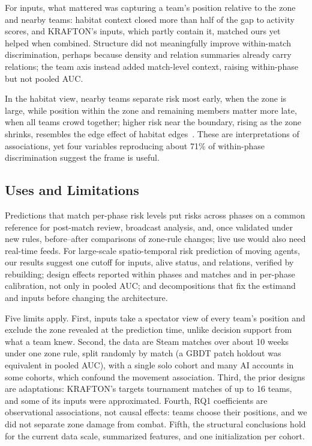 \documentclass[conference]{IEEEtran}
\begin{document}
For inputs, what mattered was capturing a team's position relative to the zone and nearby teams: habitat context closed more than half of the gap to activity scores, and KRAFTON's inputs, which partly contain it, matched ours yet helped when combined.
Structure did not meaningfully improve within-match discrimination, perhaps because density and relation summaries already carry relations; the team axis instead added match-level context, raising within-phase but not pooled AUC.

In the habitat view, nearby teams separate risk most early, when the zone is large, while position within the zone and remaining members matter more late, when all teams crowd together; higher risk near the boundary, rising as the zone shrinks, resembles the edge effect of habitat edges~\cite{Ries04}.
These are interpretations of associations, yet four variables reproducing about 71\% of within-phase discrimination suggest the frame is useful.

\subsection{Uses and Limitations}
\label{sec:discussion:implications}
Predictions that match per-phase risk levels put risks across phases on a common reference for post-match review, broadcast analysis, and, once validated under new rules, before--after comparisons of zone-rule changes; live use would also need real-time feeds.
For large-scale spatio-temporal risk prediction of moving agents, our results suggest one cutoff for inputs, alive status, and relations, verified by rebuilding; design effects reported within phases and matches and in per-phase calibration, not only in pooled AUC; and decompositions that fix the estimand and inputs before changing the architecture.

Five limits apply. First, inputs take a spectator view of every team's position and exclude the zone revealed at the prediction time, unlike decision support from what a team knew.
Second, the data are Steam matches over about 10 weeks under one zone rule, split randomly by match (a GBDT patch holdout was equivalent in pooled AUC), with a single solo cohort and many AI accounts in some cohorts, which confound the movement association.
Third, the prior designs are adaptations: KRAFTON's targets tournament matches of up to 16 teams, and some of its inputs were approximated.
Fourth, RQ1 coefficients are observational associations, not causal effects: teams choose their positions, and we did not separate zone damage from combat.
Fifth, the structural conclusions hold for the current data scale, summarized features, and one initialization per cohort.
\end{document}
